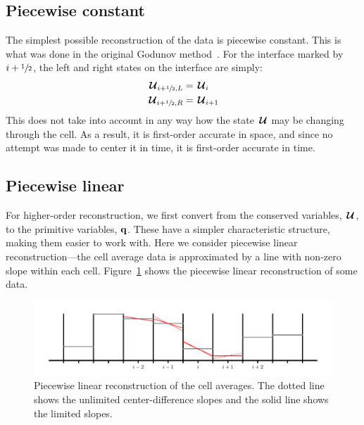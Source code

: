 \subsection{Piecewise constant}

The simplest possible reconstruction of the data is piecewise constant.
This is what was done in the original Godunov method~\cite{godunov:1959}.  For the interface
marked by $i+{\sfrac{1}{2}}$, the left and right states on the interface are simply:
\begin{align}
{\,\boldsymbol{\mathcal{U}}}_{i+{\sfrac{1}{2}},L} &= {\,\boldsymbol{\mathcal{U}}}_i \\
{\,\boldsymbol{\mathcal{U}}}_{i+{\sfrac{1}{2}},R} &= {\,\boldsymbol{\mathcal{U}}}_{i+1}
\end{align}
This does not take into account in any way how the state ${\,\boldsymbol{\mathcal{U}}}$ may be changing
through the cell.  As a result, it is first-order accurate in space, and since
no attempt was made to center it in time, it is first-order accurate in time.

\subsection{Piecewise linear}

For higher-order reconstruction, we first convert from the conserved
variables, ${\,\boldsymbol{\mathcal{U}}}$, to the primitive variables, ${\bf q}$.  These have a simpler
characteristic structure, making them easier to work with.  Here we
consider piecewise linear reconstruction---the cell average data is
approximated by a line with non-zero slope within each cell.
Figure~\ref{fig:plm} shows the piecewise linear reconstruction of some
data.


\begin{figure}[t]
\centering
\includegraphics[width=\linewidth]{piecewise-linear}
\caption[Piecewise linear reconstruction of cell average
  data]{\label{fig:plm} Piecewise linear reconstruction of the cell
  averages.  The dotted line shows the unlimited center-difference
  slopes and the solid line shows the limited slopes.}
\end{figure}

